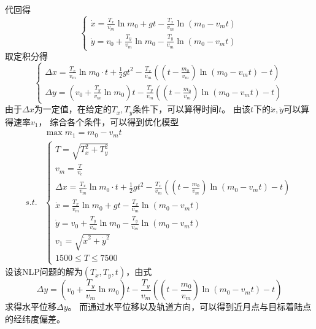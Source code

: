 \documentclass[withoutpreface,bwprint]{cumcmthesis} %
\begin{document}
    代回得
    \begin{equation}
        \begin{cases}
            \dot{x} = \frac{T_x}{v_m}\ln m_0 + gt - \frac{T_x}{v_m}\ln(m_0 - v_m t) \\
            \dot{y} = v_0 + \frac{T_y}{v_m}\ln m_0 - \frac{T_y}{v_m}\ln(m_0 - v_m t)
        \end{cases}
    \end{equation}
    取定积分得
    \begin{equation}
        \begin{cases}
            \Delta x = \frac{T_x}{v_m}\ln m_0 \cdot t + \frac{1}{2}gt^2
            - \frac{T_x}{v_m}((t - \frac{m_0}{v_m})\ln(m_0 - v_m t) - t) \\
            \Delta y = (v_0 + \frac{T_y}{v_m}\ln m_0) t
            - \frac{T_y}{v_m}((t - \frac{m_0}{v_m})\ln(m_0 - v_m t) - t)
        \end{cases}
    \end{equation}
    由于$\Delta x$为一定值，在给定的$T_x,T_y$条件下，可以算得时间$t$。
    由该$t$下的$\dot{x},\dot{y}$可以算得速率$v_1$，
    综合各个条件，可以得到优化模型
    \begin{equation}
        \begin{aligned}
            & \max m_1 = m_0 - v_m t \\
            s.t. &
            \begin{cases}
                T = \sqrt{T_x^2 + T_y^2} \\
                v_m = \frac{T}{v_e} \\
                \Delta x = \frac{T_x}{v_m}\ln m_0 \cdot t + \frac{1}{2}gt^2
                - \frac{T_x}{v_m}((t - \frac{m_0}{v_m})\ln(m_0 - v_m t) - t) \\
                \dot{x} = \frac{T_x}{v_m}\ln m_0 + gt - \frac{T_x}{v_m}\ln(m_0 - v_m t) \\
                \dot{y} = v_0 + \frac{T_y}{v_m}\ln m_0 - \frac{T_y}{v_m}\ln(m_0 - v_m t) \\
                v_1 = \sqrt{\dot{x}^2 + \dot{y}^2} \\
                1500 \le T \le 7500
            \end{cases}
        \end{aligned}
    \end{equation}
    设该NLP问题的解为$(T_x, T_y, t)$，由式
    \begin{equation*}
        \Delta y = (v_0 + \frac{T_y}{v_m}\ln m_0) t
        - \frac{T_y}{v_m}((t - \frac{m_0}{v_m})\ln(m_0 - v_m t) - t)
    \end{equation*}
    求得水平位移$\Delta y$。
    而通过水平位移以及轨道方向，可以得到近月点与目标着陆点的经纬度偏差。
\end{document}
